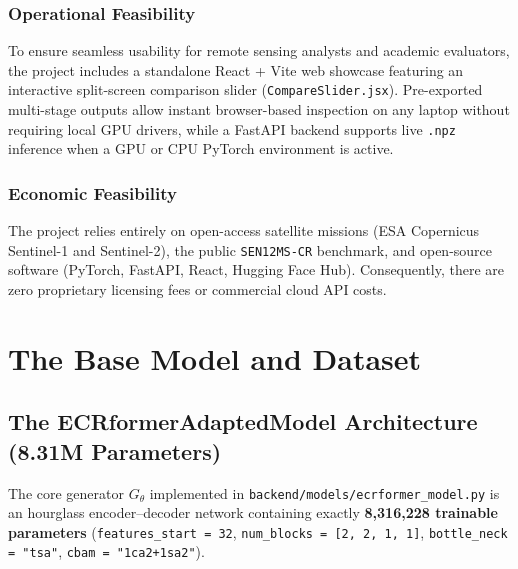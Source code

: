 \documentclass[12pt,a4paper]{report}
\begin{document}
\subsection{Operational Feasibility}
To ensure seamless usability for remote sensing analysts and academic evaluators, the project includes a standalone React + Vite web showcase featuring an interactive split-screen comparison slider (\texttt{CompareSlider.jsx}). Pre-exported multi-stage outputs allow instant browser-based inspection on any laptop without requiring local GPU drivers, while a FastAPI backend supports live \texttt{.npz} inference when a GPU or CPU PyTorch environment is active.

\subsection{Economic Feasibility}
The project relies entirely on open-access satellite missions (ESA Copernicus Sentinel-1 and Sentinel-2), the public \texttt{SEN12MS-CR} benchmark, and open-source software (PyTorch, FastAPI, React, Hugging Face Hub). Consequently, there are zero proprietary licensing fees or commercial cloud API costs.

\chapter{The Base Model and Dataset}

\section{The ECRformerAdaptedModel Architecture (8.31M Parameters)}
The core generator $G_{\theta}$ implemented in \texttt{backend/models/ecrformer\_model.py} is an hourglass encoder--decoder network containing exactly \textbf{8,316,228 trainable parameters} (\texttt{features\_start = 32}, \texttt{num\_blocks = [2, 2, 1, 1]}, \texttt{bottle\_neck = "tsa"}, \texttt{cbam = "1ca2+1sa2"}).
\end{document}
